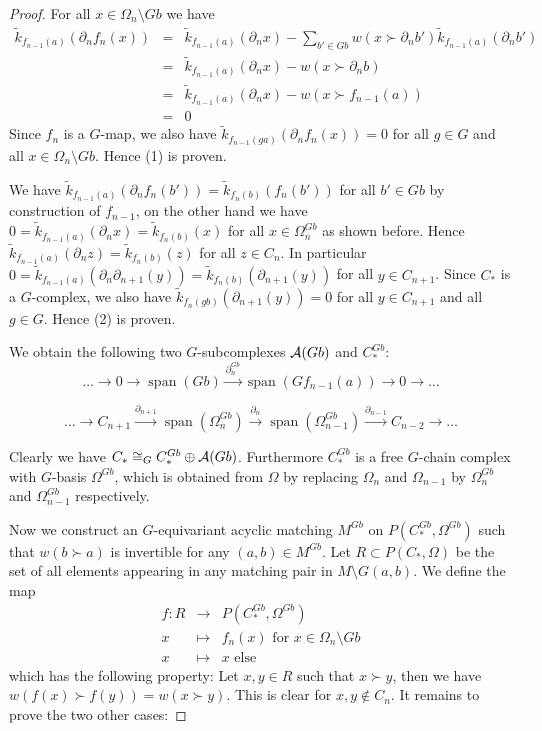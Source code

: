 \documentclass{elsarticle}
\def\span{\operatorname{span}}
\begin{document}
\begin{proof}
For all $x\in\Omega_n\setminus Gb$ we have
\begin{eqnarray*}
\widetilde k_{f_{n-1}(a)}(\partial_n f_n(x))&=&\widetilde k_{f_{n-1}(a)}(\partial_n x)-\sum_{b'\in Gb}w(x\succ\partial_n b')\widetilde k_{f_{n-1}(a)}(\partial_n b')\\
&=&\widetilde k_{f_{n-1}(a)}(\partial_n x)-w(x\succ\partial_n b)\\
&=&\widetilde k_{f_{n-1}(a)}(\partial_n x)-w(x\succ f_{n-1}(a))\\
&=&0
\end{eqnarray*}
Since $f_n$ is a $G$-map, we also have $\widetilde k_{f_{n-1}(ga)}(\partial_n f_n(x))=0$ for all $g\in G$ and all $x\in\Omega_n\setminus Gb$. Hence (1) is proven.

We have $\widetilde k_{f_{n-1}(a)}(\partial_n f_n(b'))=\widetilde k_{f_n(b)}(f_n(b'))$ for all $b'\in Gb$ by construction of $f_{n-1}$, on the other hand we have $0=\widetilde k_{f_{n-1}(a)}(\partial_n x)=\widetilde k_{f_n(b)}(x)$ for all $x\in\Omega_n^{Gb}$ as shown before. Hence $\widetilde k_{f_{n-1}(a)}(\partial_n z)=\widetilde k_{f_n(b)}(z)$ for all $z\in C_n$. In particular $0=\widetilde k_{f_{n-1}(a)}(\partial_n\partial_{n+1}(y))=\widetilde k_{f_n(b)}(\partial_{n+1}(y))$ for all $y\in C_{n+1}$. Since $C_*$ is a $G$-complex, we also have $\widetilde k_{f_n(gb)}(\partial_{n+1}(y))=0$ for all $y\in C_{n+1}$ and all $g\in G$. Hence (2) is proven.

We obtain the following two $G$-subcomplexes ${\cal A}(Gb)$ and $C_*^{Gb}$:
\[\dots\longrightarrow 0\longrightarrow\span(Gb)\overset{\partial_n^{Gb}}\longrightarrow\span(Gf_{n-1}(a))\longrightarrow 0\longrightarrow\dots\]

\[\dots\longrightarrow C_{n+1}\overset{\partial_{n+1}}\longrightarrow\span(\Omega_n^{Gb})\overset{\partial_n}\longrightarrow\span(\Omega_{n-1}^{Gb})\overset{\partial_{n-1}}\longrightarrow C_{n-2}\longrightarrow\dots\]

Clearly we have $C_*\cong_G C_*^{Gb}\oplus{\cal A}(Gb)$. Furthermore $C_*^{Gb}$ is a free $G$-chain complex with $G$-basis $\Omega^{Gb}$, which is obtained from $\Omega$ by replacing $\Omega_n$ and $\Omega_{n-1}$ by $\Omega_n^{Gb}$ and $\Omega_{n-1}^{Gb}$ respectively.

Now we construct an $G$-equivariant acyclic matching $M^{Gb}$ on $P(C_*^{Gb},\Omega^{Gb})$ such that $w(b\succ a)$ is invertible for any $(a,b)\in M^{Gb}$. Let $R\subset P(C_*,\Omega)$ be the set of all elements appearing in any matching pair in $M\setminus G(a,b)$. We define the map
\begin{eqnarray*}
f:R&\longrightarrow&P(C_*^{Gb},\Omega^{Gb})\\
x&\longmapsto&f_n(x)\text{ for $x\in\Omega_n\setminus Gb$}\\
x&\longmapsto&x\text{ else}
\end{eqnarray*}
which has the following property: Let $x,y\in R$ such that $x\succ y$, then we have $w(f(x)\succ f(y))=w(x\succ y)$. This is clear for $x,y\not\in C_n$. It remains to prove the two other cases:


\end{proof}
\end{document}
